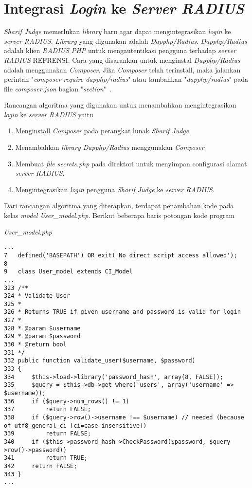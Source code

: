 \section{Integrasi \textit{Login} ke \textit{Server RADIUS}}
\textit{Sharif Judge} memerlukan \textit{library} baru agar dapat mengintegrasikan \textit{login} ke \textit{server RADIUS}. \textit{Library} yang digunakan adalah \textit{Dapphp/Radius}. \textit{Dapphp/Radius} adalah klien \textit{RADIUS PHP} untuk mengautentikasi pengguna terhadap \textit{server RADIUS} REFRENSI. Cara yang disarankan untuk menginstal \textit{Dapphp/Radius} adalah menggunakan \textit{Composer}. Jika \textit{Composer} telah terinstall, maka jalankan perintah "\textit{composer require dapphp/radius}" atau tambahkan "\textit{dapphp/radius}" pada file \textit{composer.json} bagian "\textit{section}"~\cite{drew:16:radius}.

Rancangan algoritma yang digunakan untuk menambahkan mengintegrasikan \textit{login} ke \textit{server RADIUS} yaitu
\begin{enumerate}
	\item Menginstall \textit{Composer} pada perangkat lunak \textit{Sharif Judge}.
	\item Menambahkan \textit{library Dapphp/Radius} menggunakan \textit{Composer}.
	\item Membuat \textit{file secrets.php} pada direktori  untuk menyimpan configurasi alamat \textit{server RADIUS}.
	\item Mengintegrasikan \textit{login} pengguna \textit{Sharif Judge} ke \textit{server RADIUS}.
\end{enumerate}

Dari rancangan algoritma yang diterapkan, terdapat penambahan kode pada kelas \textit{model User\_model.php}. Berikut beberapa baris potongan kode program

\textit{User\_model.php}
\begin{lstlisting}[basicstyle=\ttfamily, frame=single,
columns=fullflexible, keepspaces=true, breaklines=true]
...
7	defined('BASEPATH') OR exit('No direct script access allowed');
8
9	class User_model extends CI_Model
...
323	/**
324	* Validate User
325	*
326	* Returns TRUE if given username and password is valid for login
327	*
328	* @param $username
329	* @param $password
330	* @return bool
331	*/
332	public function validate_user($username, $password)
333	{
334		$this->load->library('password_hash', array(8, FALSE));
335		$query = $this->db->get_where('users', array('username' => $username));
336		if ($query->num_rows() != 1)
337			return FALSE;
338		if ($query->row()->username !== $username) // needed (because of utf8_general_ci [ci=case insensitive])
339			return FALSE;
340		if ($this->password_hash->CheckPassword($password, $query->row()->password))
341			return TRUE;
342		return FALSE;
343	}
...
\end{lstlisting}

